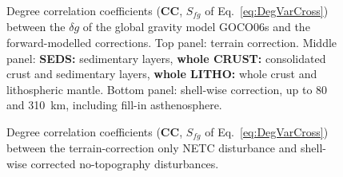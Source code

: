 \begin{figure}
    \begin{adjustbox}{center}
    \end{adjustbox}
    \caption[Degree correlation coefficients (CC) between the GGM and the forward-modelled corrections.]{
        Degree correlation coefficients (\textbf{CC}, $S_{fg}$ of Eq.~\ref{eq:DegVarCross}) between the $\delta g$ of the global gravity model {GOCO06s} and the forward-modelled corrections.
        Top panel: terrain correction.
        Middle panel:
        \textbf{{SEDS}:} sedimentary layers,
        \textbf{{whole CRUST}:} consolidated crust and sedimentary layers,
        \textbf{{whole LITHO}:} whole crust and lithospheric mantle.
        Bottom panel: shell-wise correction, up to \num{80} and \SI{310}{\kilo \metre}, including fill-in asthenosphere.
        }
    \label{fig:SigIs:Res:XCorr}
\end{figure}

\FloatBarrier

\begin{figure}[hb]
    \begin{adjustbox}{center}
    \end{adjustbox}
    \caption[Degree correlation coefficients (CC) between the uncompensated NETC and the shell-wise corrected NETC disturbances.]{Degree correlation coefficients (\textbf{CC}, $S_{fg}$ of Eq.~\ref{eq:DegVarCross}) between the terrain-correction only NETC disturbance and shell-wise corrected no-topography disturbances.}
    \label{fig:SigIs:Res:XCorrISO}
\end{figure}

